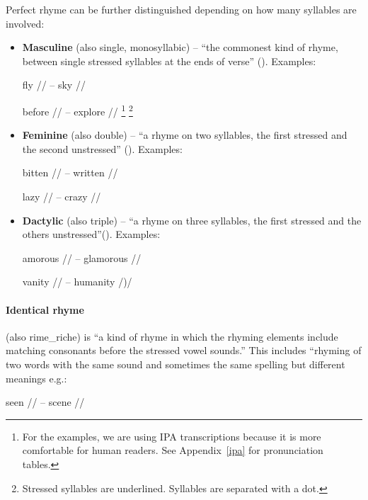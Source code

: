 Perfect rhyme can be further distinguished depending on how many syllables are involved:

\begin{itemize}
	\item \textbf{Masculine} (also single, monosyllabic) -- ``the commonest kind of rhyme, between single stressed syllables at the ends of verse'' (\cite{oxforddict2008literary}). 
	Examples: 
	
	fly // -- sky //
	
	before // -- explore //
	\footnote{For the examples, we are using IPA transcriptions because it is more comfortable for human readers. See Appendix~\ref{ipa} for pronunciation tables.}
	\footnote{Stressed syllables are underlined. Syllables are separated with a dot.}
	
	\item \textbf{Feminine} (also double) -- ``a rhyme on two syllables, the first stressed and the second unstressed'' (\cite{oxforddict2008literary}). Examples: 
	
	bitten // -- written //
	
	lazy // -- crazy //
	
	\item \textbf{Dactylic} (also triple) -- ``a rhyme on three syllables, the first stressed and the others unstressed''(\cite{oxforddict2008literary}). Examples: 
	
	amorous // -- glamorous //
	
	vanity // -- humanity /)/
	
\end{itemize}


\paragraph{Identical rhyme} (also \gls{rime_riche}) is ``a kind of rhyme in which the rhyming elements include matching consonants before the stressed vowel sounds.'' This includes ``rhyming of two words with the same sound and sometimes the same spelling but different meanings e.g.:

seen // -- scene //

